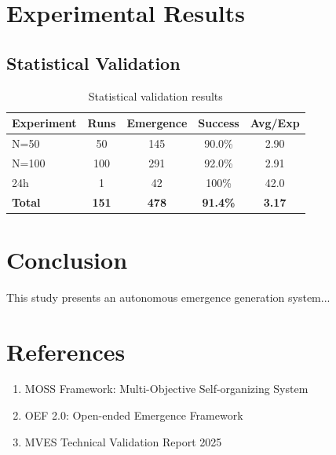 \documentclass[11pt,a4paper]{article}
\begin{document}
\section{Experimental Results}
\subsection{Statistical Validation}

\begin{table}[h]
\centering
\begin{tabular}{lcccc}
\toprule
\textbf{Experiment} & \textbf{Runs} & \textbf{Emergence} & \textbf{Success} & \textbf{Avg/Exp} \\
\midrule
N=50 & 50 & 145 & 90.0\% & 2.90 \\
N=100 & 100 & 291 & 92.0\% & 2.91 \\
24h & 1 & 42 & 100\% & 42.0 \\
\textbf{Total} & \textbf{151} & \textbf{478} & \textbf{91.4\%} & \textbf{3.17} \\
\bottomrule
\end{tabular}
\caption{Statistical validation results}
\end{table}

\section{Conclusion}
This study presents an autonomous emergence generation system...

\section*{References}
\begin{enumerate}
    \item MOSS Framework: Multi-Objective Self-organizing System
    \item OEF 2.0: Open-ended Emergence Framework
    \item MVES Technical Validation Report 2025
\end{enumerate}
\end{document}
